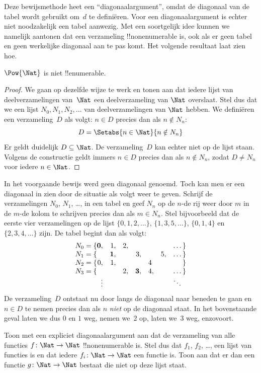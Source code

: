 \documentclass[../../../include/open-logic-section]{subfiles}
\begin{document}
\begin{explain}
Deze bewijsmethode heet een ``diagonaalargument'', omdat de diagonaal van
de tabel wordt gebruikt om~$d$ te definiëren. Voor een diagonaalargument
is echter niet noodzakelijk een tabel aanwezig. Met een soortgelijk idee
kunnen we namelijk aantonen dat een verzameling !!{nonenumerable} is,
ook als er geen tabel en geen werkelijke diagonaal aan te pas komt. Het
volgende resultaat laat zien hoe.
\end{explain}

\begin{thm}
$\Pow{\Nat}$ is niet !!{enumerable}.
\end{thm}

\begin{proof}
We gaan op dezelfde wijze te werk en tonen aan dat iedere lijst van
deelverzamelingen van~$\Nat$ een deelverzameling van $\Nat$ overslaat.
Stel dus dat we een lijst $N_0, N_1, N_2, \ldots$ van
deelverzamelingen van $\Nat$ hebben. We definiëren een verzameling~$D$
als volgt: $n \in D$ precies dan als $n \notin N_{n}$:
\[
D = \Setabs{n \in \Nat}{n \notin N_n}
\]
Er geldt duidelijk $D\subseteq \Nat$. De verzameling~$D$ kan echter
niet op de lijst staan. Volgens de constructie geldt immers $n \in D$
precies dan als $n\notin N_n$, zodat $D \neq N_n$ voor iedere
$n \in \Nat$.
\end{proof}

\begin{explain}
In het voorgaande bewijs werd geen diagonaal genoemd. Toch kan men er
een diagonaal in zien door de situatie als volgt weer te geven. Schrijf
de verzamelingen $N_0$, $N_1$, \dots, in een tabel en geef $N_n$ op de
$n$-de rij weer door $m$ in de $m$-de kolom te schrijven precies dan
als $m \in N_n$. Stel bijvoorbeeld dat de eerste vier verzamelingen op
de lijst $\{0,1,2,\dots\}$, $\{1, 3, 5, \dots\}$, $\{0,1,4\}$ en
$\{2,3,4,\dots\}$ zijn. De tabel begint dan als volgt:
\[
\begin{array}{r@{}rrrrrrr}
  N_0 = \{ & \mathbf{0}, & 1, & 2, & & & & \dots\}\\
  N_1 = \{ &  & \mathbf{1}, &  & 3, &  & 5, & \dots\}\\
  N_2 = \{ & 0, & 1, &  &  & 4\phantom{,} &  & \}\\
  N_3 = \{ &  &  & 2, & \mathbf{3}, & 4, & & \dots\}\\
  &\vdots & & & & & & \ddots\phantom{\}}
  \end{array}
\]
De verzameling~$D$ ontstaat nu door langs de diagonaal naar beneden te
gaan en $n \in D$ te nemen precies dan als $n$ \emph{niet} op de
diagonaal staat. In het bovenstaande geval laten we dus $0$ en $1$
weg, nemen we~$2$ op, laten we~$3$ weg, enzovoort.
\end{explain}

\begin{prob}
Toon met een expliciet diagonaalargument aan dat de verzameling van
alle functies $f \colon \Nat \to \Nat$ !!{nonenumerable} is. Stel dus
dat $f_1$, $f_2$, \dots, een lijst van functies is en dat iedere
$f_i\colon \Nat \to \Nat$ een functie is. Toon aan dat er dan een
functie $g \colon \Nat \to \Nat$ bestaat die niet op deze lijst staat.
\end{prob}
\end{document}
